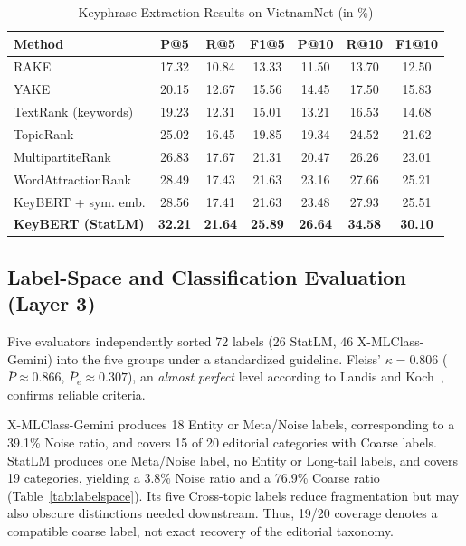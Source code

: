 \begin{table}[!t]
\renewcommand{\arraystretch}{1.2}
\caption{Keyphrase-Extraction Results on VietnamNet (in \%)}
\label{tab:keyphrase}
\centering
\scriptsize
\setlength{\tabcolsep}{4pt}
\begin{tabular}{@{}lcccccc@{}}
\toprule
\textbf{Method} & \textbf{P@5} & \textbf{R@5} & \textbf{F1@5} & \textbf{P@10} & \textbf{R@10} & \textbf{F1@10} \\
\midrule
RAKE                       & 17.32 & 10.84 & 13.33 & 11.50 & 13.70 & 12.50 \\
YAKE                       & 20.15 & 12.67 & 15.56 & 14.45 & 17.50 & 15.83 \\
TextRank (keywords)        & 19.23 & 12.31 & 15.01 & 13.21 & 16.53 & 14.68 \\
TopicRank                  & 25.02 & 16.45 & 19.85 & 19.34 & 24.52 & 21.62 \\
MultipartiteRank           & 26.83 & 17.67 & 21.31 & 20.47 & 26.26 & 23.01 \\
WordAttractionRank         & 28.49 & 17.43 & 21.63 & 23.16 & 27.66 & 25.21 \\
KeyBERT + sym. emb.        & 28.56 & 17.41 & 21.63 & 23.48 & 27.93 & 25.51 \\
\textbf{KeyBERT (StatLM)}  & \textbf{32.21} & \textbf{21.64} & \textbf{25.89} & \textbf{26.64} & \textbf{34.58} & \textbf{30.10} \\
\bottomrule
\end{tabular}
\end{table}

\subsection{Label-Space and Classification Evaluation (Layer 3)}
Five evaluators independently sorted 72 labels (26 StatLM, 46 X-MLClass-Gemini) into the five groups under a standardized guideline. Fleiss' $\kappa=0.806$ ($\bar P\approx0.866$, $\bar P_e\approx0.307$), an \emph{almost perfect} level according to Landis and Koch~\cite{landis1977}, confirms reliable criteria.

X-MLClass-Gemini produces 18 Entity or Meta/Noise labels, corresponding to a 39.1\% Noise
ratio, and covers 15 of 20 editorial categories with Coarse labels. StatLM produces
one Meta/Noise label, no Entity or Long-tail labels, and covers 19 categories,
yielding a 3.8\% Noise ratio and a 76.9\% Coarse ratio
(Table~\ref{tab:labelspace}). Its five Cross-topic labels reduce fragmentation but
may also obscure distinctions needed downstream. Thus, 19/20 coverage denotes a
compatible coarse label, not exact recovery of the editorial taxonomy.

